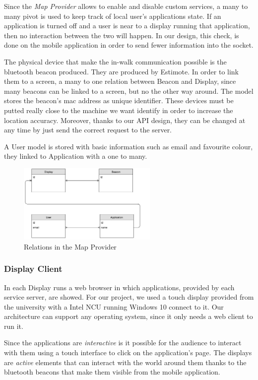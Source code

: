 \documentclass[]{usiinfbachelorproject}
\begin{document}
Since the \emph{Map Provider} allows to enable and disable custom services, a many to many pivot is used to keep track of local user's applications state. If an application is turned off and a user is near to a display running that application, then no interaction between the two will happen. In our design, this check, is done on the mobile application in order to send fewer information into the socket.

The physical device that make the in-walk communication possible is the bluetooth beacon produced. They are produced by Estimote. In order to link them to a screen, a many to one relation between Beacon and Display, since many beacons can be linked to a screen, but no the other way around. The model stores the beacon's mac address as unique identifier. These devices must be putted really close to the machine we want identify in order to increase the location accuracy. Moreover, thanks to our API design, they can be changed at any time by just send the correct request to the server.

A User model is stored with basic information such as email and favourite colour, they linked to Application with a one to many. 
\begin{figure}[H]
  \centering
  \includegraphics[width=0.6\textwidth]{./images/TacitaRelations.jpg}
   \caption{Relations in the Map Provider}

\end{figure} 

\subsubsection{Display Client}
In each Display runs a web browser in which applications, provided by each service server, are showed. For our project, we used a touch display provided from the university with a Intel NCU running Windows 10 connect to it. Our architecture can support any operating system, since it only needs a web client to run it.
  
 Since the applications are \emph{interactive} is it possible for the audience to interact with them using a touch interface to click on the application's page. The displays are \emph{active} elements that can interact with the world around them thanks to the bluetooth beacons that make them visible from the mobile application.
 
\end{document}
